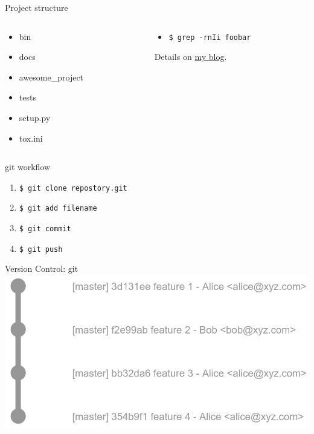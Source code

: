 \documentclass{beamer}
\newcommand{\FolderOpen}[1][.8\ht\strutbox]{%
      \texttt{[image: graphics/FolderOpen]}%
    }
\newcommand{\FileImage}[1][.8\ht\strutbox]{%
      \texttt{[image: graphics/file]}%
    }
\begin{document}
\begin{frame}{Project structure}
    \begin{columns}
        \begin{column}{0.5\textwidth}
            \begin{itemize}
                \item[\FolderOpen] bin
                \item[\FolderOpen] docs
                \item[\FolderOpen] awesome\_project
                \item[\FolderOpen] tests
                \item[\FileImage] setup.py
                \item[\FileImage] tox.ini
            \end{itemize}
        \end{column}
        \begin{column}{0.5\textwidth}
            \begin{itemize}
                \item[\textcolor{green}{\ding{58}}] \texttt{\$ grep -rnIi foobar}
            \end{itemize}
            Details on \href{https://martin-thoma.com/python-projects/}{my blog}.
        \end{column}
    \end{columns}
\end{frame}

\begin{frame}{git workflow}
    \begin{enumerate}
        \item \texttt{\$ git clone repostory.git}
        \item \texttt{\$ git add filename}
        \item \texttt{\$ git commit}
        \item \texttt{\$ git push}
    \end{enumerate}

\end{frame}

\begin{frame}{Version Control: git}
    \includegraphics[width=1.0\textwidth]{graphics/git-simple.png}
\end{frame}
\end{document}
